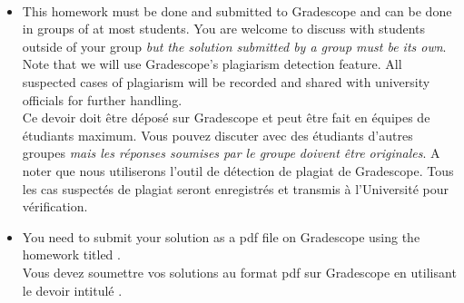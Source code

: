\documentclass[11pt,french,english]{article}
\newcommand{\french}[1]{ {\color{blue} #1} }
\begin{document}
\paragraph{}
\begin{itemize}
\item This homework must be done and submitted to Gradescope and can be done in groups of at most \iftoggle{undergrad}{2}{2} students.
You are welcome to discuss with students outside of your group  \emph{but the solution submitted by a group must be its own}.
Note that we will use Gradescope's plagiarism detection feature.
All suspected cases of plagiarism will be recorded and shared with university officials for further handling.\\
\french{Ce devoir doit être déposé sur Gradescope  et peut être fait en équipes de \iftoggle{undergrad}{2}{2} étudiants maximum. Vous pouvez discuter avec des étudiants d'autres groupes  \emph{mais les réponses soumises par le groupe doivent être originales}. A noter que nous utiliserons l'outil de détection de plagiat de Gradescope. Tous les cas suspectés de plagiat seront enregistrés et transmis à l'Université pour vérification.}

\item You need to submit your solution as a pdf file on Gradescope using the homework titled 
\iftoggle{undergrad}{\texttt{(3395: UNDERGRAD) Theoretical Homework 2}}{\texttt{(6390: GRAD) Theoretical Homework 2}}.
\\
\french{Vous devez soumettre vos solutions au format pdf sur Gradescope en utilisant le devoir intitulé \iftoggle{undergrad}{\texttt{(3395: UNDERGRAD) Theoretical Homework 2}}{\texttt{(6390: GRAD) Theoretical Homework 2}}.}
\end{itemize} 
\end{document}
